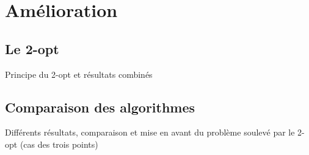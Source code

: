 \documentclass[10pt]{beamer}
\begin{document}

	\section{Amélioration}

	\subsection{Le 2-opt}

	\begin{frame}
		Principe du 2-opt et résultats combinés
	\end{frame}

	\subsection{Comparaison des algorithmes}

	\begin{frame}
		Différents résultats, comparaison et mise en avant du problème soulevé par le 2-opt (cas des trois points)
	\end{frame}
\end{document}
